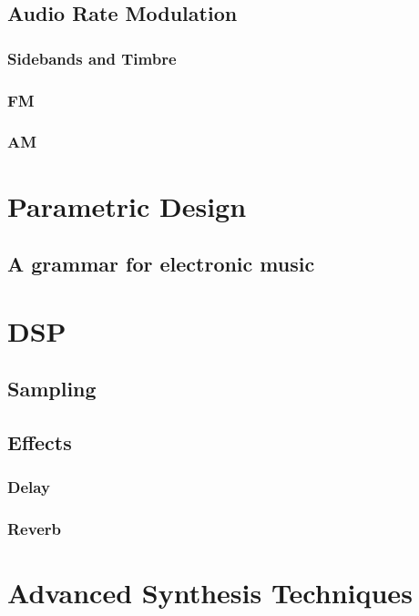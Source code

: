 \documentclass[11pt]{article}
\begin{document}
\subsection{Audio Rate Modulation}
\label{sec:orgc9a33af}
\subsubsection{Sidebands and Timbre}
\label{sec:org7c9110b}
\subsubsection{FM}
\label{sec:org54c95f4}
\subsubsection{AM}
\label{sec:orgf8c31e0}

\section{Parametric Design}
\label{sec:org403ab55}
\subsection{A grammar for electronic music}
\label{sec:orga3abb7a}

\section{DSP}
\label{sec:org6760cc9}
\subsection{Sampling}
\label{sec:org87e8cba}
\subsection{Effects}
\label{sec:org393a0c2}
\subsubsection{Delay}
\label{sec:org41188d8}
\subsubsection{Reverb}
\label{sec:org2227eb7}

\section{Advanced Synthesis Techniques}
\label{sec:org6c7ab41}
\end{document}
